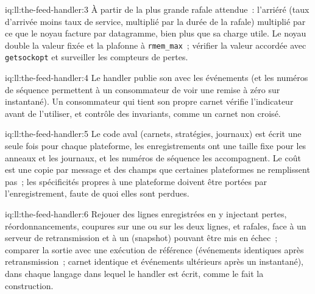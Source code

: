 \begin{solution}{iq:ll:the-feed-handler:3}
À partir de la plus grande rafale attendue~: l'arriéré (taux d'arrivée moins taux de service, multiplié par la durée de la rafale) multiplié par ce que le noyau
facture par datagramme, bien plus que sa charge utile. Le noyau double la valeur fixée et la plafonne à \texttt{rmem\_max}~;
vérifier la valeur accordée avec \texttt{getsockopt} et surveiller les compteurs de pertes.
\end{solution}

\begin{solution}{iq:ll:the-feed-handler:4}
Le handler publie son  avec les événements (et les numéros de séquence permettent à un consommateur de voir une remise à zéro sur instantané). Un
consommateur qui tient son propre carnet vérifie l'indicateur avant de l'utiliser, et contrôle des invariants, comme un carnet non croisé.
\end{solution}

\begin{solution}{iq:ll:the-feed-handler:5}
Le code aval (carnets, stratégies, journaux) est écrit une seule fois pour chaque plateforme, les enregistrements ont une taille fixe pour les anneaux et les journaux, et
les numéros de séquence les accompagnent. Le coût est une copie par message et des champs que certaines plateformes ne remplissent pas~; les spécificités propres à une
plateforme doivent être portées par l'enregistrement, faute de quoi elles sont perdues.
\end{solution}

\begin{solution}{iq:ll:the-feed-handler:6}
Rejouer des lignes enregistrées en y injectant pertes, réordonnancements, coupures sur une ou sur les deux lignes, et rafales, face à un serveur de
retransmission et à un  (snapshot) pouvant être mis en échec~; comparer la sortie avec une exécution de référence (événements identiques après
retransmission~; carnet identique et événements ultérieurs après un instantané), dans chaque langage dans lequel le handler est écrit, comme le fait
la construction.
\end{solution}
